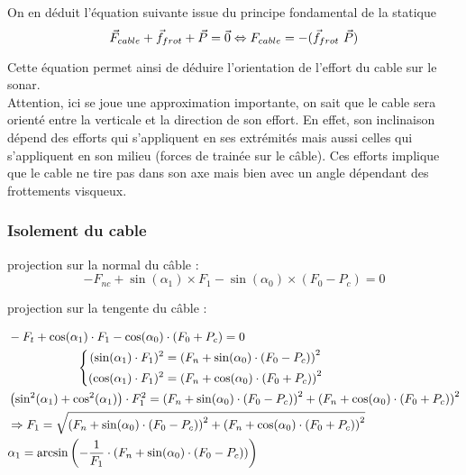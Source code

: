\documentclass[12pt,a4paper]{report}
\begin{document}
On en déduit l'équation suivante issue du principe fondamental de la statique
\\
\[
    \vec{F}_{cable} + \vec{f}_{frot} + \vec{P} = \vec{0} \\
    \Leftrightarrow  {F}_{cable} = - (\vec{f}_{frot} \ \vec{P})
\]

Cette équation permet ainsi de déduire l'orientation de l'effort du cable sur le sonar. \\
Attention, ici se joue une approximation importante, on sait que le cable sera orienté entre la verticale et la
direction de son effort. En effet, son inclinaison dépend des efforts qui s'appliquent en ses extrémités mais aussi
celles qui s'appliquent en son milieu (forces de trainée sur le câble). Ces efforts implique que le cable ne tire pas
dans son axe mais bien avec un angle dépendant des frottements visqueux.

\subsubsection*{Isolement du cable}

projection sur la normal du câble :
\[
    -F_{nc} + \sin(\alpha_1) \times F_1 - \sin(\alpha_0) \times (F_0 - P_{c}) = 0
\]

projection sur la tengente du câble :

\begin{align*}
    &-F_{t} + \cos(\alpha_1) \cdot F_1 - \cos(\alpha_0) \cdot (F_0 + P_c) = 0 \\
    &\hspace*{2cm}\left\{
    \begin{aligned}
        (\sin(\alpha_1) \cdot F_1)^2 &= \left(F_{n} + \sin(\alpha_0) \cdot (F_0 - P_c)\right)^2 \\
        (\cos(\alpha_1) \cdot F_1)^2 &= \left(F_{n} + \cos(\alpha_0) \cdot (F_0 + P_c)\right)^2
    \end{aligned}
    \right. \\
    &\left( \sin^2(\alpha_1) + \cos^2(\alpha_1) \right) \cdot F_1^2 =
    \left(F_{n} + \sin(\alpha_0) \cdot (F_0 - P_c)\right)^2 +
    \left(F_{n} + \cos(\alpha_0) \cdot (F_0 + P_c)\right)^2 \\
    &\Rightarrow F_1 = \sqrt{
        \left(F_{n} + \sin(\alpha_0) \cdot (F_0 - P_c)\right)^2 +
        \left(F_{n} + \cos(\alpha_0) \cdot (F_0 + P_c)\right)^2
    } \\
    &\alpha_1 = \arcsin\left(
        -\frac{1}{F_1} \cdot \left(F_{n} + \sin(\alpha_0) \cdot (F_0 - P_c)\right)
    \right)
\end{align*}
\end{document}
